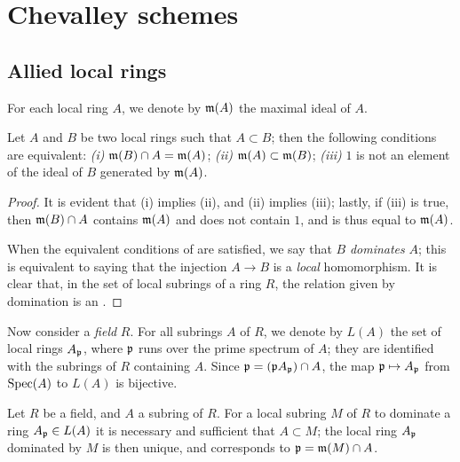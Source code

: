 \section{Chevalley schemes}
\label{section-chevalley-schemes}

\subsection{Allied local rings}
\label{subsection-allied-local-rings}

For each local ring $A$, we denote by $\mathfrak{m}(A)$ the maximal ideal of
$A$.

\begin{lem}[8.1.1]
\label{1.8.1.1}
Let $A$ and $B$ be two local rings such that $A\subset B$;
then the following conditions are equivalent: {\em (i)}
$\mathfrak{m}(B)\cap A=\mathfrak{m}(A)$; {\em (ii)}
$\mathfrak{m}(A)\subset\mathfrak{m}(B)$; {\em (iii)} $1$ is not an element of
the ideal of $B$ generated by $\mathfrak{m}(A)$.
\end{lem}

\begin{proof}
\label{proof-1.8.1.1}
It is evident that (i) implies (ii), and (ii) implies (iii); lastly, if (iii) is
true, then $\mathfrak{m}(B)\cap A$ contains $\mathfrak{m}(A)$ and does not
contain $1$, and is thus equal to $\mathfrak{m}(A)$.

When the equivalent conditions of  are satisfied, we say that $B$
{\em dominates} $A$; this is equivalent to saying that the injection $A\to B$
is a {\em local} homomorphism. It is clear that, in the set of local subrings
of a ring $R$, the relation given by domination is an .
\end{proof}

\begin{env}[8.1.2]
\label{1.8.1.2}
Now consider a {\em field} $R$. For all subrings $A$ of
$R$, we denote by $L(A)$ the set of local rings $A_\mathfrak{p}$, where
$\mathfrak{p}$ runs over the prime spectrum of $A$; they are identified with the
subrings of $R$ containing $A$. Since
$\mathfrak{p}=(\mathfrak{p}A_\mathfrak{p})\cap A$, the map
$\mathfrak{p}\mapsto A_\mathfrak{p}$ from ${\mathop{\mathrm{Spec}}\nolimits}(A)$ to $L(A)$ is bijective.
\end{env}

\begin{lem}[8.1.3]
\label{1.8.1.3}
Let $R$ be a field, and $A$ a subring of $R$. For a
local subring $M$ of $R$ to dominate a ring $A_\mathfrak{p}\in L(A)$ it is
necessary and sufficient that $A\subset M$; the local ring $A_\mathfrak{p}$
dominated by $M$ is then unique, and corresponds to
$\mathfrak{p}=\mathfrak{m}(M)\cap A$.
\end{lem}

